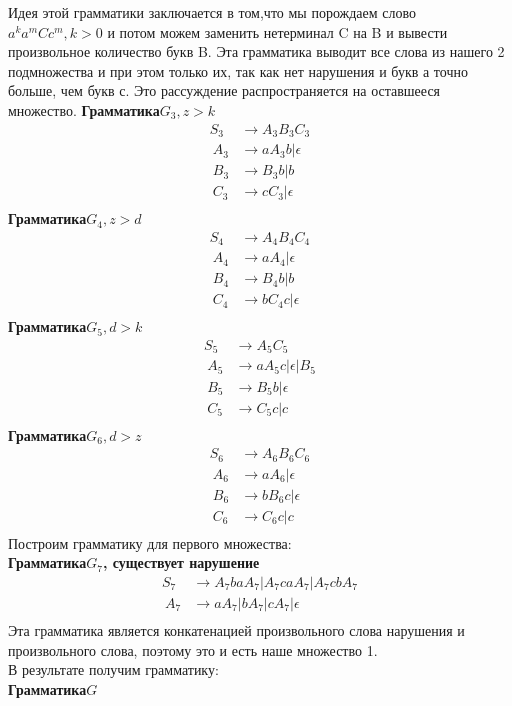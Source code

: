 \documentclass[a4paper,12pt]{article}
\begin{document}
Идея этой грамматики заключается в том,что мы порождаем слово $a^ka^mCc^m, k>0$ и потом можем заменить нетерминал C на B и вывести произвольное количество букв B. Эта грамматика выводит все слова из нашего 2 подмножества и при этом только их, так как нет нарушения и букв а точно больше, чем букв с. Это рассуждение распространяется на оставшееся множество.
\textbf{Грамматика$ G_3,z>k$}
\begin{align*}
	S_3&\to A_3B_3C_3\\\
	A_3&\to aA_3b|\epsilon\\\
	B_3&\to B_3b|b\\\
	C_3&\to cC_3|\epsilon\\\
\end{align*}
\textbf{Грамматика$ G_4,z>d$}
\begin{align*}
	S_4&\to A_4B_4C_4\\\
	A_4&\to aA_4|\epsilon\\\
	B_4&\to B_4b|b\\\
	C_4&\to bC_4c|\epsilon\\\
\end{align*}
\textbf{Грамматика$ G_5,d>k$}
\begin{align*}
	S_5&\to A_5C_5\\\
	A_5&\to aA_5c|\epsilon|B_5\\\
	B_5&\to B_5b|\epsilon\\\
	C_5&\to C_5c|c\\\
\end{align*}
\textbf{Грамматика$ G_6,d>z$}
\begin{align*}
	S_6&\to A_6B_6C_6\\\
	A_6&\to aA_6|\epsilon\\\
	B_6&\to bB_6c|\epsilon\\\
	C_6&\to C_6c|c\\\
\end{align*}
Построим грамматику для первого множества:\\
\textbf{Грамматика$ G_7$, существует нарушение}
\begin{align*}
	S_7&\to A_7baA_7|A_7caA_7|A_7cbA_7\\\
	A_7&\to aA_7|bA_7|cA_7|\epsilon\\\
\end{align*}
Эта грамматика является конкатенацией произвольного слова нарушения и произвольного слова, поэтому это и есть наше множество 1.\\
В результате получим грамматику:\\
\textbf{Грамматика$ G$}
\end{document}
